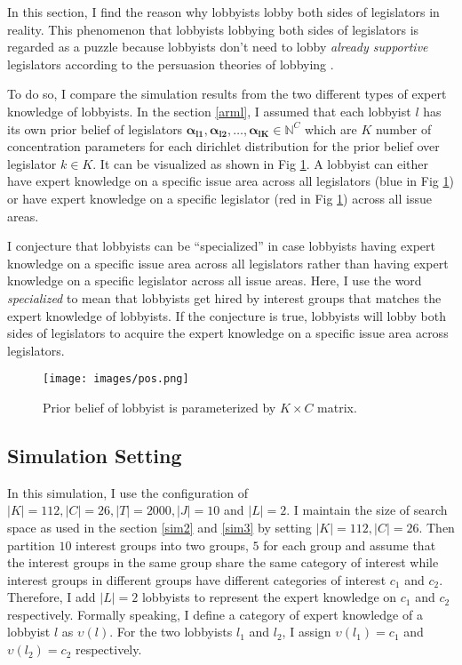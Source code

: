 \documentclass{article}
\begin{document}
In this section, I find the reason
why lobbyists lobby both sides of legislators in reality.
This phenomenon that lobbyists lobbying both sides of legislators 
is regarded as a puzzle because lobbyists don't need to 
lobby \textit{already supportive} legislators according to the persuasion theories of lobbying \citep{10.2307/2586303}.


To do so, I compare the simulation results from the two different types of expert knowledge of lobbyists.
In the section \ref{arml}, I assumed 
that each lobbyist $l$ has its own prior belief of legislators $\mathbf{\alpha_{l1}}, \mathbf{\alpha_{l2}}, \hdots, \mathbf{\alpha_{lK}} \in \mathbb{N}^C$ which are $K$ number of concentration parameters for each dirichlet distribution for the prior belief over legislator $k \in K$.
It can be visualized as shown in Fig \ref{fig:mesh1}. 
A lobbyist can either have expert knowledge 
on a specific issue area across all legislators (blue in Fig \ref{fig:mesh1}) or
have expert knowledge on a specific legislator (red in Fig \ref{fig:mesh1})
across all issue areas. 

I conjecture that lobbyists can be ``specialized'' 
in case lobbyists having 
expert knowledge on a specific issue area across all legislators
rather than having expert knowledge 
on a specific legislator across all issue areas.
Here, I use the word \textit{specialized} to mean that
lobbyists get hired by interest groups 
that matches the expert knowledge of lobbyists.
If the conjecture is true, 
lobbyists will lobby both sides of legislators
to acquire 
the expert knowledge on a specific issue area
across  legislators.

\begin{figure}[h!]
    \centering
    \texttt{[image: images/pos.png]}
    \caption{Prior belief of lobbyist is parameterized by $K \times C$ matrix.}
    \label{fig:mesh1}
\end{figure}



\subsection{\large{Simulation Setting}}

In this simulation, 
I use the configuration of $|K|=112, |C|=26, |T|=2000, |J|=10$ and $|L|=2$. 
I maintain the size of search space as used in the section \ref{sim2} and \ref{sim3} by setting $|K|=112, |C|=26$.
Then partition $10$ interest groups 
into two groups, $5$ for each group and 
assume that the interest groups in the same group share the same category of interest 
while interest groups in different groups have different categories of interest $c_1$ and $c_2$.
Therefore, I add $|L|=2$ lobbyists to represent 
the expert knowledge on $c_1$ and $c_2$ respectively.
Formally speaking, I define a category of expert knowledge of a lobbyist $l$ as 
$\upsilon(l)$. For the two lobbyists $l_1$ and $l_2$, I assign $\upsilon(l_1) = c_1$ and $\upsilon(l_2) = c_2$ respectively.
\end{document}
